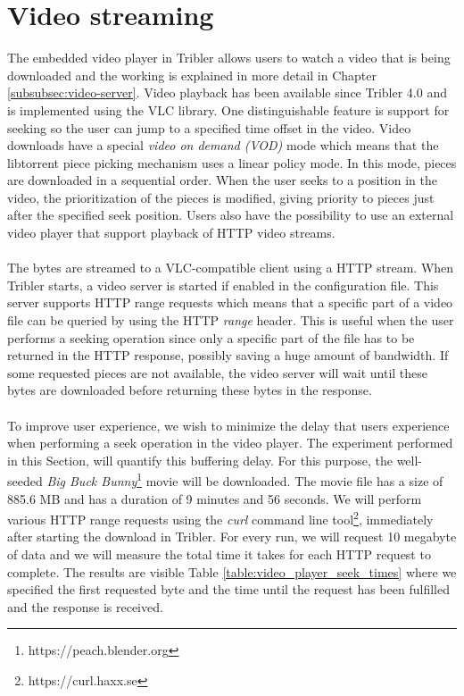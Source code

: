 \section{Video streaming}
The embedded video player in Tribler allows users to watch a video that is being downloaded and the working is explained in more detail in Chapter \ref{subsubsec:video-server}. Video playback has been available since Tribler 4.0 and is implemented using the VLC library. One distinguishable feature is support for seeking so the user can jump to a specified time offset in the video. Video downloads have a special \emph{video on demand (VOD)} mode which means that the libtorrent piece picking mechanism uses a linear policy mode. In this mode, pieces are downloaded in a sequential order. When the user seeks to a position in the video, the prioritization of the pieces is modified, giving priority to pieces just after the specified seek position. Users also have the possibility to use an external video player that support playback of HTTP video streams.\\\\
The bytes are streamed to a VLC-compatible client using a HTTP stream. When Tribler starts, a video server is started if enabled in the configuration file. This server supports HTTP range requests which means that a specific part of a video file can be queried by using the HTTP \emph{range} header. This is useful when the user performs a seeking operation since only a specific part of the file has to be returned in the HTTP response, possibly saving a huge amount of bandwidth. If some requested pieces are not available, the video server will wait until these bytes are downloaded before returning these bytes in the response.\\\\
To improve user experience, we wish to minimize the delay that users experience when performing a seek operation in the video player. The experiment performed in this Section, will quantify this buffering delay. For this purpose, the well-seeded \emph{Big Buck Bunny}\footnote{https://peach.blender.org} movie will be downloaded. The movie file has a size of 885.6 MB and has a duration of 9 minutes and 56 seconds. We will perform various HTTP range requests using the \emph{curl} command line tool\footnote{https://curl.haxx.se}, immediately after starting the download in Tribler. For every run, we will request 10 megabyte of data and we will measure the total time it takes for each HTTP request to complete. The results are visible Table \ref{table:video_player_seek_times} where we specified the first requested byte and the time until the request has been fulfilled and the response is received.\\

